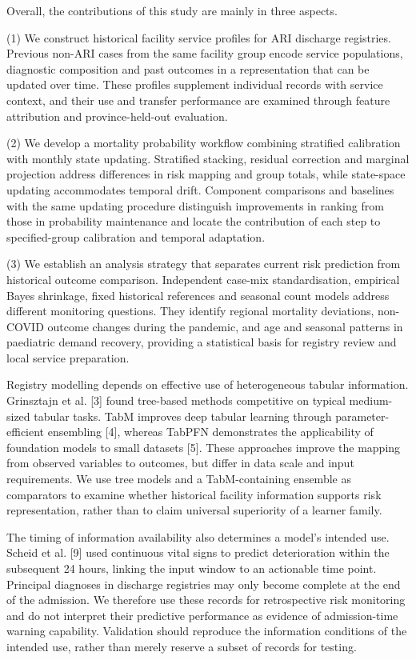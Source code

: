 \documentclass[11pt,a4paper]{article}
\newcommand{\mainheading}[1]{\par\needspace{4\baselineskip}\vspace{7pt}{\large\bfseries #1}\par\vspace{3pt}}
\newcommand{\subheading}[1]{\par\needspace{3\baselineskip}\vspace{5pt}{\bfseries #1}\par\vspace{1pt}}
\begin{document}
Overall, the contributions of this study are mainly in three aspects.

(1) We construct historical facility service profiles for ARI discharge registries. Previous non-ARI cases from the same facility group encode service populations, diagnostic composition and past outcomes in a representation that can be updated over time. These profiles supplement individual records with service context, and their use and transfer performance are examined through feature attribution and province-held-out evaluation.

(2) We develop a mortality probability workflow combining stratified calibration with monthly state updating. Stratified stacking, residual correction and marginal projection address differences in risk mapping and group totals, while state-space updating accommodates temporal drift. Component comparisons and baselines with the same updating procedure distinguish improvements in ranking from those in probability maintenance and locate the contribution of each step to specified-group calibration and temporal adaptation.

(3) We establish an analysis strategy that separates current risk prediction from historical outcome comparison. Independent case-mix standardisation, empirical Bayes shrinkage, fixed historical references and seasonal count models address different monitoring questions. They identify regional mortality deviations, non-COVID outcome changes during the pandemic, and age and seasonal patterns in paediatric demand recovery, providing a statistical basis for registry review and local service preparation.

\clearpage
\mainheading{2 Related work}
\subheading{2.1 Tabular learning and representations of service context}
Registry modelling depends on effective use of heterogeneous tabular information. Grinsztajn et al. [3] found tree-based methods competitive on typical medium-sized tabular tasks. TabM improves deep tabular learning through parameter-efficient ensembling [4], whereas TabPFN demonstrates the applicability of foundation models to small datasets [5]. These approaches improve the mapping from observed variables to outcomes, but differ in data scale and input requirements. We use tree models and a TabM-containing ensemble as comparators to examine whether historical facility information supports risk representation, rather than to claim universal superiority of a learner family.

The timing of information availability also determines a model's intended use. Scheid et al. [9] used continuous vital signs to predict deterioration within the subsequent 24 hours, linking the input window to an actionable time point. Principal diagnoses in discharge registries may only become complete at the end of the admission. We therefore use these records for retrospective risk monitoring and do not interpret their predictive performance as evidence of admission-time warning capability. Validation should reproduce the information conditions of the intended use, rather than merely reserve a subset of records for testing.
\end{document}
